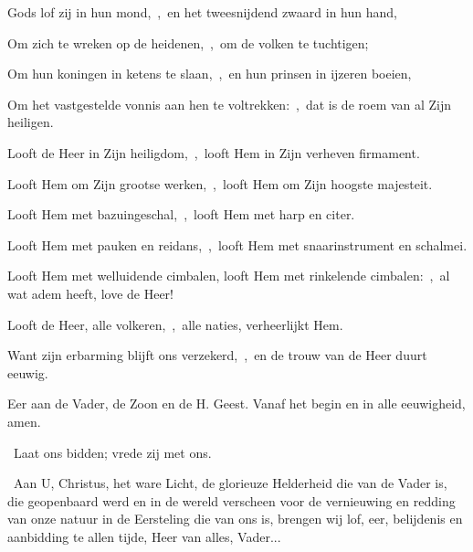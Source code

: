 \documentclass[12pt,twoside,a5paper]{article}
\begin{document}
\begin{halfparskip}
  Gods lof zij in hun mond,~\sep\ en het tweesnijdend zwaard in hun hand,

  Om zich te wreken op de heidenen,~\sep\ om de volken te tuchtigen;

  Om hun koningen in ketens te slaan,~\sep\ en hun prinsen in ijzeren boeien,

  Om het vastgestelde vonnis aan hen te voltrekken:~\sep\ dat is de roem van al Zijn heiligen.

   Looft de Heer in Zijn heiligdom,~\sep\ looft Hem in Zijn verheven firmament.

  Looft Hem om Zijn grootse werken,~\sep\ looft Hem om Zijn hoogste majesteit.

  Looft Hem met bazuingeschal,~\sep\ looft Hem met harp en citer.

  Looft Hem met pauken en reidans,~\sep\ looft Hem met snaarinstrument en schalmei.

  Looft Hem met welluidende cimbalen, looft Hem met rinkelende cimbalen:~\sep\ al wat adem heeft, love de Heer!

   Looft de Heer, alle volkeren,~\sep\ alle naties, verheerlijkt Hem.

  Want zijn erbarming blijft ons verzekerd,~\sep\ en de trouw van de Heer duurt eeuwig.

  Eer aan de Vader, de Zoon en de H. Geest. Vanaf het begin en in alle eeuwigheid, amen.

\end{halfparskip}

\begin{halfparskip}
  \dd~Laat ons bidden; vrede zij met ons.

  \cc~Aan U, Christus, het ware Licht, de glorieuze Helderheid die van de Vader is, die geopenbaard werd en in de wereld verscheen voor de vernieuwing en redding van onze natuur in de Eersteling die van ons is, brengen wij lof, eer, belijdenis en aanbidding te allen tijde, Heer van alles, Vader...
\end{halfparskip}



 
\end{document}
